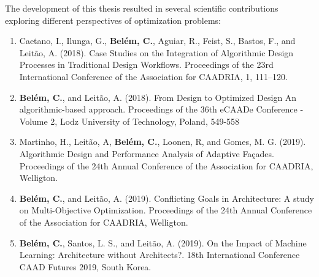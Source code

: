 The development of this thesis resulted in several scientific contributions exploring different perspectives of optimization problems:

\begin{enumerate}
\item Caetano, I., Ilunga, G., \textbf{Belém, C.}, Aguiar, R., Feist, S., Bastos, F., and Leitão, A. (2018). Case Studies on the Integration of Algorithmic Design Processes in Traditional Design Workflows. Proceedings of the 23rd International Conference of the Association for CAADRIA, 1, 111–120.

\item \textbf{Belém, C.}, and Leitão, A. (2018). From Design to Optimized Design An algorithmic-based approach. Proceedings of the 36th eCAADe Conference - Volume 2, Lodz University of Technology, Poland, 549-558

\item Martinho, H., Leitão, A, \textbf{Belém, C.}, Loonen, R, and Gomes, M. G. (2019). Algorithmic Design and Performance Analysis of Adaptive Façades. Proceedings of the 24th Annual Conference of the Association for CAADRIA, Welligton.

\item \textbf{Belém, C.}, and Leitão, A. (2019). Conflicting Goals in Architecture: A study on Multi-Objective Optimization. Proceedings of the 24th Annual Conference of the Association for CAADRIA, Welligton.

\item \textbf{Belém, C.}, Santos, L. S., and Leitão, A. (2019). On the Impact of Machine Learning: Architecture without Architects?. 18th International Conference CAAD Futures 2019, South Korea.


\end{enumerate}



